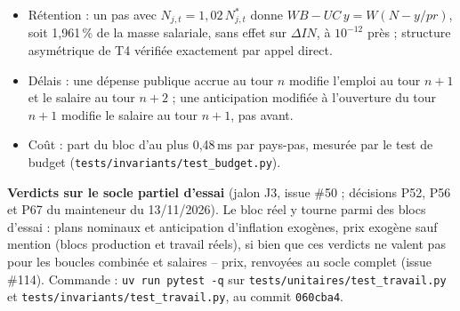 \documentclass[11pt,a4paper]{article}
\begin{document}
\begin{itemize}
\item Rétention : un pas avec $N_{j,t} = 1{,}02\,N^{\ast}_{j,t}$ donne $\mathit{WB} - \mathit{UC}\,y = W(N - y/\mathit{pr})$, soit 1,961\,\% de la masse salariale, sans effet sur $\Delta\mathit{IN}$, à $10^{-12}$ près ; structure asymétrique de T4 vérifiée exactement par appel direct.
\item Délais : une dépense publique accrue au tour $n$ modifie l'emploi au tour $n + 1$ et le salaire au tour $n + 2$ ; une anticipation modifiée à l'ouverture du tour $n + 1$ modifie le salaire au tour $n + 1$, pas avant.
\item Coût : part du bloc d'au plus 0,48\,ms par pays-pas, mesurée par le test de budget (\nolinkurl{tests/invariants/test_budget.py}).
\end{itemize}

{\setlength{\emergencystretch}{3em}\textbf{Verdicts sur le socle partiel d'essai} (jalon J3, issue \#50 ; décisions P52, P56 et P67 du mainteneur du 13/11/2026). Le bloc réel y tourne parmi des blocs d'essai : plans nominaux et anticipation d'inflation exogènes, prix exogène sauf mention (blocs production et travail réels), si bien que ces verdicts ne valent pas pour les boucles combinée et salaires -- prix, renvoyées au socle complet (issue \#114). Commande : \texttt{uv run pytest -q} sur \nolinkurl{tests/unitaires/test_travail.py} et \nolinkurl{tests/invariants/test_travail.py}, au commit \texttt{060cba4}.\par}
\end{document}
